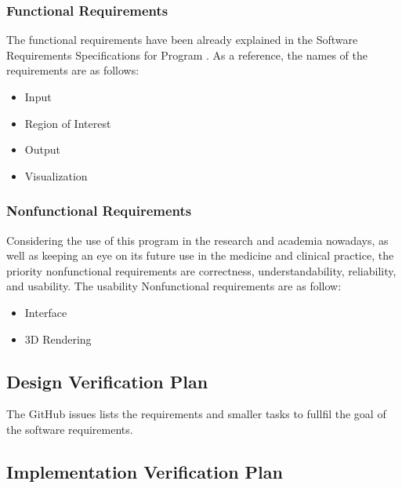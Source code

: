 \documentclass[12pt, titlepage]{article}
\begin{document}
\subsubsection{Functional Requirements}
The functional requirements have been already explained in the Software Requirements Specifications for Program \progname{}. As a reference, the names of the requirements are as follows:
\begin{itemize}
\item {Input}
\item {Region of Interest}
\item {Output}
\item {Visualization}
\end{itemize} 


\subsubsection{Nonfunctional Requirements}
Considering the use of this program in the research and academia nowadays, as well as keeping an eye on its future use in the medicine and clinical practice, the priority nonfunctional
requirements are correctness, understandability, reliability, and usability. The usability Nonfunctional requirements are as follow:
\begin{itemize}
\item {Interface}
\item {3D Rendering}
\end{itemize} 




\subsection{Design Verification Plan}

The GitHub issues lists the requirements and smaller tasks to fullfil the goal of the software requirements.
%
%

\subsection{Implementation Verification Plan}
\end{document}

